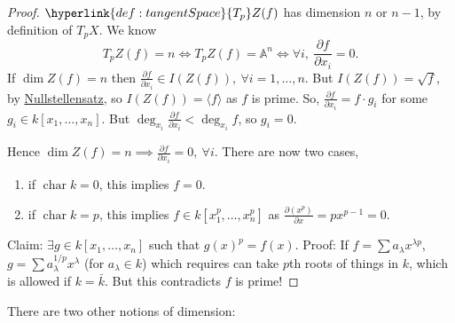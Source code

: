 \documentclass{article}
\newcommand{\A}{\mathbb{A}}
\DeclareMathOperator{\chara}{char}
\begin{document}
\begin{proof}
    $\hyperlink{def:tangentSpace}{T_p} Z(f)$ has dimension $n$ or $n-1$, by definition of $T_p X$.
    We know
    \begin{equation*}
        T_pZ(f) = n \iff T_p Z(f) = \A^n \iff \forall i,\ \frac{\partial f}{\partial x_i} = 0.
    \end{equation*}
    If $\dim Z(f) = n$ then $\frac{\partial f}{\partial x_i} \in I(Z(f)),\ \forall i=1, \dotsc, n$.
    But $I(Z(f)) = \sqrt{f}$, by \hyperlink{def:null2}{Nullstellensatz}, so $I(Z(f))=\langle f \rangle$ as $f$ is prime.
    So, $\frac{\partial f}{\partial x_i} = f \cdot g_i$ for some $g_i \in k[x_1, \dotsc, x_n]$.
    But $\deg_{x_i} \frac{\partial f}{\partial x_i} < \deg_{x_i} f$, so $g_i = 0$.

    Hence $\dim Z(f) = n \implies \frac{\partial f}{\partial x_i} = 0,\ \forall i$.
    There are now two cases,
    \begin{enumerate}[label=(\roman*)]
        \item if $\chara k = 0$, this implies $f = 0$.
        \item if $\chara k = p$, this implies $f \in k[x_1^p, \dotsc, x_n^p]$ as $\frac{\partial (x^p)}{\partial x} = p x^{p-1} = 0$.
    \end{enumerate}
    Claim: $\exists g \in k[x_1, \dotsc, x_n]$ such that $g(x)^p = f(x)$.
    Proof: If $f = \sum a_\lambda x^{\lambda p}$, $g = \sum a_\lambda^{1/p} x^\lambda$ (for $a_\lambda \in k$) which requires can take $p$th roots of things in $k$, which is allowed if $k = \bar{k}$.
    But this contradicts $f$ is prime!
\end{proof}
There are two other notions of dimension:
\end{document}
